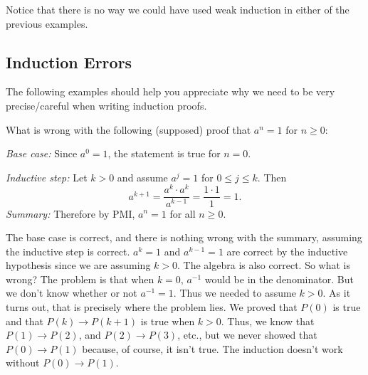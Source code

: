 Notice that there is no way we could have used weak induction in either of the previous examples.

\newpage
\subsection{Induction Errors}

The following examples should help you appreciate why we need 
to be very precise/careful when writing induction proofs.



\begin{exa}
What is wrong with the following (supposed) proof that $a^n=1$ for $n\geq 0$:
\begin{pf}
{\em Base case:} Since $a^0=1$, the statement is true for $n=0$.

\noindent
{\em Inductive step:} Let $k>0$ and assume $a^j=1$ for $0\leq j\leq k$.
Then
$$a^{k+1} = \frac{a^k\cdot a^k}{a^{k-1}}=\frac{1\cdot 1}{1} = 1.$$
{\em Summary:} Therefore by PMI, $a^n=1$ for all $n\geq 0$.
\end{pf}
\begin{sol}
The base case is correct, and there is nothing wrong with the summary, assuming the
inductive step is correct.
$a^k=1$ and $a^{k-1}=1$ are correct by the inductive hypothesis
since we are assuming $k>0$.  The algebra is also correct.
So what is wrong?
The problem is that when  $k=0$, $a^{-1}$ would be in the denominator.
But we don't know whether or not $a^{-1}=1$.  Thus we needed to assume $k>0$.
As it turns out, that is precisely where the problem lies.
We proved that $P(0)$ is true and that $P(k)\rightarrow P(k+1)$ is true when $k>0$.
Thus, we know that $P(1)\rightarrow P(2)$, and $P(2)\rightarrow P(3)$, etc., but 
we never showed that $P(0)\rightarrow P(1)$ because, of course, it isn't true.
The induction doesn't work without $P(0)\rightarrow P(1)$.
\end{sol}
\end{exa}


